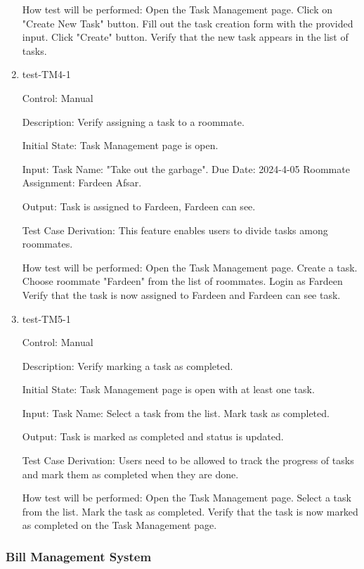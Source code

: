 \documentclass[12pt, titlepage]{article}
\begin{document}
\begin{enumerate}
How test will be performed: 
Open the Task Management page.
Click on "Create New Task" button.
Fill out the task creation form with the provided input.
Click "Create" button.
Verify that the new task appears in the list of tasks.


\item{test-TM4-1\\}

Control: Manual

Description: Verify assigning a task to a roommate.
					
Initial State: Task Management page is open.
					
Input: Task Name: "Take out the garbage".
Due Date: 2024-4-05
Roommate Assignment: Fardeen Afsar.
					
Output: Task is assigned to Fardeen, Fardeen can see.

Test Case Derivation: This feature enables users to divide tasks among roommates.

How test will be performed: 
Open the Task Management page.
Create a task.
Choose roommate "Fardeen" from the list of roommates.
Login as Fardeen
Verify that the task is now assigned to Fardeen and Fardeen can see task.

\item{test-TM5-1\\}

Control: Manual

Description: Verify marking a task as completed.
					
Initial State: Task Management page is open with at least one task.
					
Input: Task Name: Select a task from the list.
Mark task as completed.
					
Output: Task is marked as completed and status is updated.

Test Case Derivation: Users need to be allowed to track the progress of tasks and mark them as completed when they are done.

How test will be performed: 
Open the Task Management page.
Select a task from the list.
Mark the task as completed.
Verify that the task is now marked as completed on the Task Management page.



\end{enumerate}

\subsubsection{Bill Management System}
\end{document}
